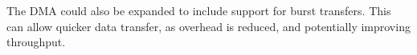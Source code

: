 The DMA could also be expanded to include support for burst transfers. This can allow quicker data
transfer, as overhead is reduced, and potentially improving throughput.


%
%


%

